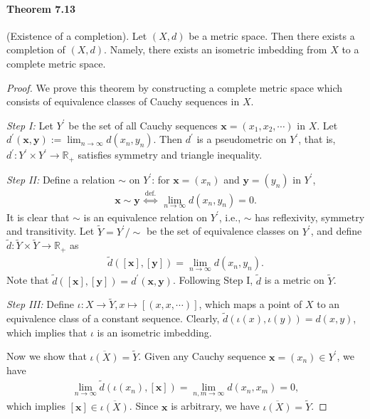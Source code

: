 \documentclass{article}
\numberwithin{equation}{section}
\theoremstyle{plain}
\theoremstyle{definition}
\begin{document}
\paragraph{Theorem 7.13\label{thm:7.13}} (Existence of a completion). Let $(X,d)$ be a metric space. Then there exists a completion of $(X,d)$. Namely, there exists an isometric imbedding from $X$ to a complete metric space.
\begin{proof}
We prove this theorem by constructing a complete metric space which consists of equivalence classes of Cauchy sequences in $X$.

\textit{Step I:} Let $Y^\prime$ be the set of all Cauchy sequences $\mathbf{x}=(x_1,x_2,\cdots)$ in $X$. Let $d^\prime(\mathbf{x},\mathbf{y}):=\lim_{n\to\infty}d(x_n,y_n)$. Then $d^\prime$ is a pseudometric on $Y^\prime$, that is, $d^\prime:Y^\prime\times Y^\prime\to\mathbb{R}_+$ satisfies symmetry and triangle inequality.

\vspace{0.12cm}
\textit{Step II:} Define a relation $\sim$ on $Y^\prime$: for $\mathbf{x}=(x_n)$ and $\mathbf{y}=(y_n)$ in $Y^\prime$, 
\begin{align*}
	\mathbf{x}\sim\mathbf{y}\ \overset{\mathrm{def.}}{\Leftrightarrow}\ \lim_{n\to\infty}d(x_n,y_n)=0.
\end{align*}
It is clear that $\sim$ is an equivalence relation on $Y^\prime$, i.e., $\sim$ has reflexivity, symmetry and transitivity. Let $\widetilde{Y}=Y^\prime/\sim$ be the set of equivalence classes on $Y^\prime$, and define $\tilde{d}:\widetilde{Y}\times\widetilde{Y}\to\mathbb{R}_+$ as
\begin{align*}
	\tilde{d}([\mathbf{x}],[\mathbf{y}])=\lim_{n\to\infty} d(x_n,y_n).
\end{align*}
Note that $\tilde{d}([\mathbf{x}],[\mathbf{y}])=d^\prime(\mathbf{x},\mathbf{y})$. Following Step I, $\tilde{d}$ is a metric on $\widetilde{Y}$.

\vspace{0.12cm}
\textit{Step III:} Define $\iota:X\to\widetilde{Y},x\mapsto[(x,x,\cdots)]$, which maps a point of $X$ to an equivalence class of a constant sequence. Clearly, $\tilde{d}(\iota(x),\iota(y))=d(x,y)$, which implies that $\iota$ is an isometric imbedding.

Now we show that $\overline{\iota(X)}=\widetilde{Y}$. Given any Cauchy sequence $\mathbf{x}=(x_n)\in Y^\prime$, we have
\begin{align*}
	\lim_{n\to\infty}\tilde{d}(\iota(x_n),[\mathbf{x}])=\lim_{n,m\to\infty} d(x_n,x_m) = 0,
\end{align*}
which implies $[\mathbf{x}]\in\overline{\iota(X)}$. Since $\mathbf{x}$ is arbitrary, we have $\overline{\iota(X)}=\widetilde{Y}$.


\end{proof}
\end{document}
